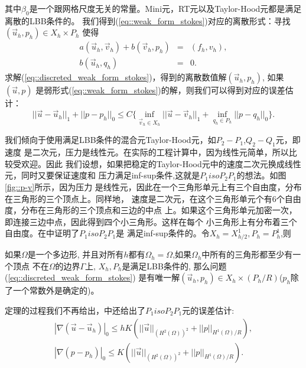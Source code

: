     其中$\beta_0$是一个跟网格尺度无关的常量。Mini元，RT元以及Taylor-Hood元都是满足离散的LBB条件的。
    我们得到(\ref{eq::weak_form_stokes})对应的离散形式：寻找$(\vec{u}_h, p_h) \in X_h \times P_h$ 使得
    \begin{equation}
        \begin{aligned}
            a(\vec{u}_h, \vec{v}_h) + b(\vec{v}_h, p_h) &=& (f_h,v_h), \\
            b(\vec{u}_h, q_h) &=& 0.
        \end{aligned}
        \label{eq::discreted_weak_form_stokes}
    \end{equation}
    求解(\ref{eq::discreted_weak_form_stokes})，得到的离散数值解$(\vec{u}_h, p_h)$, 如果$(\vec{u}, p)$
    是弱形式(\ref{eq::weak_form_stokes})的解，则我们可以得到对应的误差估计：
    \begin{equation}
        ||\vec{u} - \vec{u}_h||_1 + ||p - p_h||_0 \leq C\{\inf\limits_{\vec{v}_h \in X_h} ||\vec{u} - \vec{v}_h||_1
        + \inf\limits_{q_h \in P_h} ||p - q_h||_0\}.
    \end{equation}

    我们倾向于使用满足LBB条件的混合元Taylor-Hood元，如$P_2-P_1$,$Q_2-Q_1$元，即速度
    是二次元，压力是线性元。在实际的工程计算中，因为线性元简单，所以比较受欢迎。因此
    我们设想，如果把稳定的Taylor-Hood元中的速度二次元换成线性元，同时又要保证速度和
    压力满足inf-sup条件,这就是$P_1isoP_2P_1$的想法。如图\ref{fig::p-v}所示，因为压力
    是线性元，因此在一个三角形单元上有三个自由度，分布在三角形的三个顶点上。同样地，
    速度是二次元，在这个三角形单元个有6个自由度，分布在三角形的三个顶点和三边的中点
    上。如果这个三角形单元加密一次，即连接三边中点，因此得到四个小三角形。这样在每个
    小三角形上有分布着三个自由度。在\cite{bercovier1979error}中证明了$P_1isoP_2P_1$是
    满足inf-sup条件的。令$X_h = X_{h/2}^1, P_h = P_h^1$,则
    \begin{theorem}
        如果$\Omega$是一个多边形, 并且对所有$h$都有$\Omega_h = \Omega$,如果$\Omega_h$中所有的三角形都至少有一个顶点
        不在$\Omega$的边界$\Gamma$上, $X_h, P_h$是满足LBB条件的, 那么问题(\ref{eq::discreted_weak_form_stokes})
        是有唯一解$(\vec{u}_h, p_h) \in X_h \times (P_h/R)$($p_h$除了一个常数外是确定的)。
    \end{theorem}
    定理的过程我们不再给出，\cite{bercovier1979error}中还给出了$P_1isoP_2P_1$元的误差估计:
    \begin{eqnarray}
        {|\nabla (\vec{u} - \vec{u}_h)|}_0 \leq h K( ||\vec{u}||_{(H^2(\Omega))^2} + ||p||_{H^1(\Omega)/R}), \\
        {|\nabla (p - p_h)|}_0 \leq K (||\vec{u}||_{(H^2(\Omega))^2} + ||p||_{H^1(\Omega)/R} ).
    \end{eqnarray}

